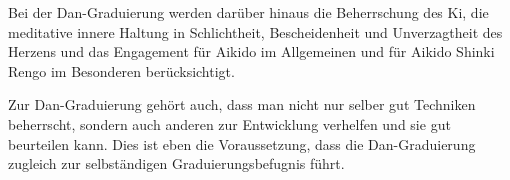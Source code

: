Bei der Dan-Graduierung werden darüber hinaus die Beherrschung des Ki, die meditative innere Haltung in Schlichtheit, Bescheidenheit und Unverzagtheit des Herzens und das Engagement für Aikido im Allgemeinen und für Aikido Shinki Rengo im Besonderen berücksichtigt.

Zur Dan-Graduierung gehört auch, dass man nicht nur selber gut Techniken beherrscht, sondern auch anderen zur Entwicklung verhelfen und sie gut beurteilen kann. Dies ist eben die Voraussetzung, dass die Dan-Graduierung zugleich zur selbständigen Graduierungsbefugnis führt.

